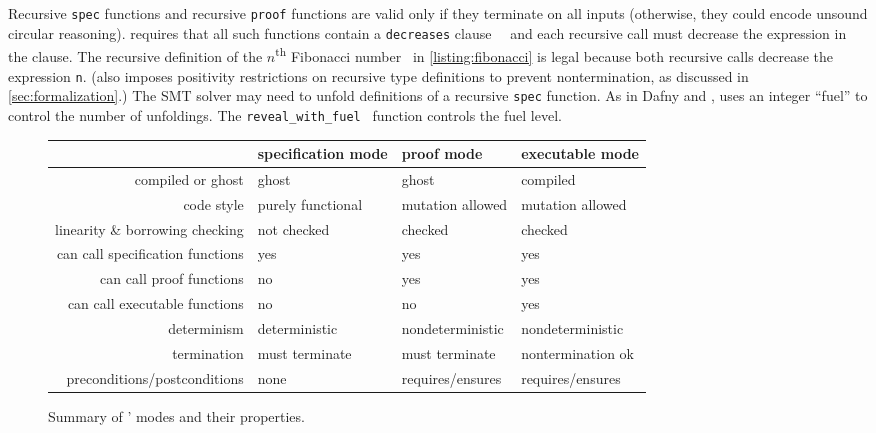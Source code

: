 Recursive \verb`spec` functions and recursive \verb`proof` functions are valid only if they terminate on all inputs
(otherwise, they could encode unsound circular reasoning).
\verus requires that all such functions contain a \verb`decreases` clause~~
and each recursive call must decrease the expression in the clause. The recursive definition of
the $n$\textsuperscript{th} Fibonacci number~ in \autoref{listing:fibonacci}
is legal because both recursive calls decrease the expression \verb`n`.
(\verus also imposes positivity restrictions on recursive type definitions to prevent
nontermination, as discussed in \autoref{sec:formalization}.)
The SMT solver may need to unfold definitions of a recursive \verb`spec` function.
As in Dafny and \fstar, \verus uses an integer ``fuel'' to control the number of unfoldings.
The \verb`reveal_with_fuel`~ function controls the fuel level.

\begin{figure}
  \centering
  \small
  \begin{tabular}{r|l|l|l}
    \hline
    ~ & specification mode & proof mode & executable mode \\ \hline
    compiled or ghost & ghost & ghost & compiled \\
    code style & purely functional & mutation allowed & mutation allowed \\
    linearity \& borrowing checking & not checked & checked & checked \\
    can call specification functions & yes & yes & yes \\
    can call proof functions & no & yes & yes \\
    can call executable functions & no & no & yes \\
    determinism & deterministic & nondeterministic & nondeterministic \\
    termination & must terminate & must terminate & nontermination ok \\
    preconditions/postconditions & none & requires/ensures & requires/ensures \\
    \hline
  \end{tabular}
  \caption{Summary of \verus' modes and their properties.}
  \label{fig:modes}
\end{figure}

